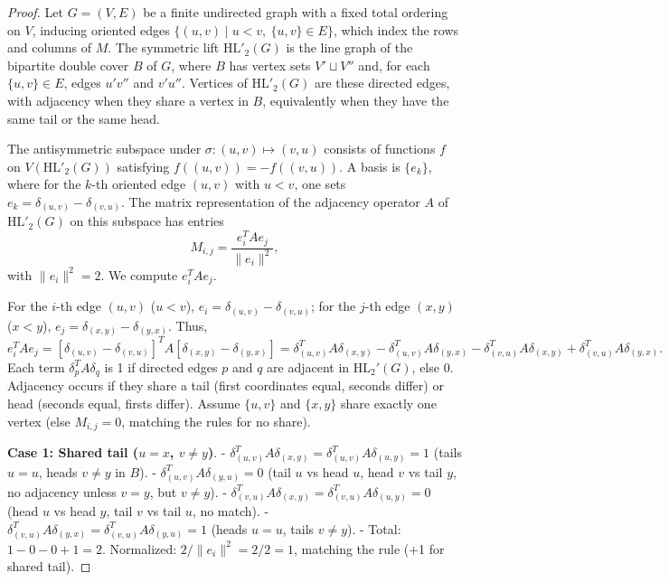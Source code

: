 \documentclass[11pt]{article}
\newcommand{\HL}{\mathrm{HL}}
\theoremstyle{plain}
\begin{document}
\begin{proof}
Let \(G=(V,E)\) be a finite undirected graph with a fixed total ordering on \(V\), inducing oriented edges
\(\{(u,v)\mid u<v,\ \{u,v\}\in E\}\), which index the rows and columns of \(M\). The symmetric lift
\(\HL'_2(G)\) is the line graph of the bipartite double cover \(B\) of \(G\), where \(B\) has vertex sets
\(V'\sqcup V''\) and, for each \(\{u,v\}\in E\), edges \(u'v''\) and \(v'u''\). Vertices of \(\HL'_2(G)\)
are these directed edges, with adjacency when they share a vertex in \(B\), equivalently when they have the
same tail or the same head.

The antisymmetric subspace under \(\sigma:(u,v)\mapsto (v,u)\) consists of functions \(f\) on
\(V(\HL'_2(G))\) satisfying \(f((u,v))=-f((v,u))\). A basis is \(\{e_k\}\), where for the \(k\)-th oriented
edge \((u,v)\) with \(u<v\), one sets \(e_k=\delta_{(u,v)}-\delta_{(v,u)}\). The matrix representation of the
adjacency operator \(A\) of \(\HL'_2(G)\) on this subspace has entries
\[
M_{i,j}=\frac{e_i^{T}Ae_j}{\|e_i\|^2},
\]
with \(\|e_i\|^2=2\). We compute \(e_i^TAe_j\).

For the $i$-th edge $(u,v)$ ($u < v$), $e_i = \delta_{(u,v)} - \delta_{(v,u)}$; for the $j$-th edge $(x,y)$ ($x < y$), $e_j = \delta_{(x,y)} - \delta_{(y,x)}$. Thus,
\[
e_i^T A e_j = [\delta_{(u,v)} - \delta_{(v,u)}]^T A [\delta_{(x,y)} - \delta_{(y,x)}] = \delta_{(u,v)}^T A \delta_{(x,y)} - \delta_{(u,v)}^T A \delta_{(y,x)} - \delta_{(v,u)}^T A \delta_{(x,y)} + \delta_{(v,u)}^T A \delta_{(y,x)}.
\]
Each term $\delta_p^T A \delta_q$ is 1 if directed edges $p$ and $q$ are adjacent in $\mathrm{HL}_2'(G)$, else 0. Adjacency occurs if they share a tail (first coordinates equal, seconds differ) or head (seconds equal, firsts differ). Assume $\{u,v\}$ and $\{x,y\}$ share exactly one vertex (else $M_{i,j} = 0$, matching the rules for no share).

\textbf{Case 1: Shared tail ($u = x$, $v \neq y$)}.  
- $\delta_{(u,v)}^T A \delta_{(x,y)} = \delta_{(u,v)}^T A \delta_{(u,y)} = 1$ (tails $u = u$, heads $v \neq y$ in $B$).
- $\delta_{(u,v)}^T A \delta_{(y,u)} = 0$ (tail $u$ vs head $u$, head $v$ vs tail $y$, no adjacency unless $v = y$, but $v \neq y$).
- $\delta_{(v,u)}^T A \delta_{(x,y)} = \delta_{(v,u)}^T A \delta_{(u,y)} = 0$ (head $u$ vs head $y$, tail $v$ vs tail $u$, no match).
- $\delta_{(v,u)}^T A \delta_{(y,x)} = \delta_{(v,u)}^T A \delta_{(y,u)} = 1$ (heads $u = u$, tails $v \neq y$).
- Total: $1 - 0 - 0 + 1 = 2$. Normalized: $2 / \|e_i\|^2 = 2/2 = 1$, matching the rule (+1 for shared tail).


\end{proof}
\end{document}
